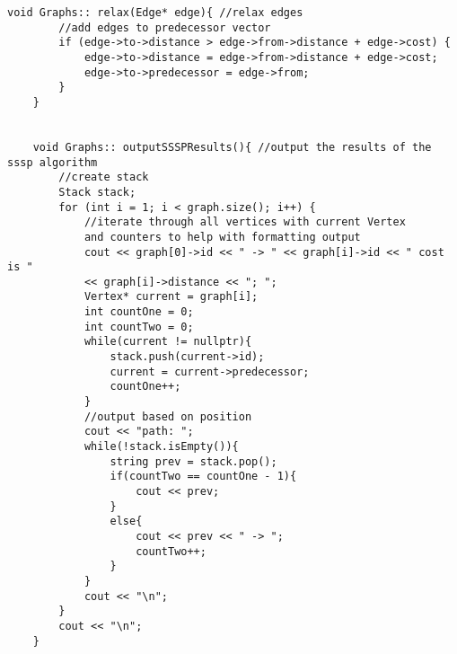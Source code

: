 \documentclass[letterpaper, 10pt,DIV=13]{scrartcl}
\numberwithin{equation}{section} %
\numberwithin{figure}{section} %
\numberwithin{table}{section} %
\begin{document}
\begin{lstlisting}[frame=single, ]
    void Graphs:: relax(Edge* edge){ //relax edges
        //add edges to predecessor vector
        if (edge->to->distance > edge->from->distance + edge->cost) {
            edge->to->distance = edge->from->distance + edge->cost;
            edge->to->predecessor = edge->from;
        }
    }
    
    
    void Graphs:: outputSSSPResults(){ //output the results of the sssp algorithm
        //create stack
        Stack stack;
        for (int i = 1; i < graph.size(); i++) {
            //iterate through all vertices with current Vertex 
            and counters to help with formatting output
            cout << graph[0]->id << " -> " << graph[i]->id << " cost is " 
            << graph[i]->distance << "; ";
            Vertex* current = graph[i];
            int countOne = 0;
            int countTwo = 0;
            while(current != nullptr){
                stack.push(current->id);
                current = current->predecessor;
                countOne++;
            }
            //output based on position
            cout << "path: ";
            while(!stack.isEmpty()){
                string prev = stack.pop();
                if(countTwo == countOne - 1){
                    cout << prev; 
                }
                else{
                    cout << prev << " -> "; 
                    countTwo++;
                }
            }
            cout << "\n";
        }
        cout << "\n";
    }
    \end{lstlisting}
\end{document}
